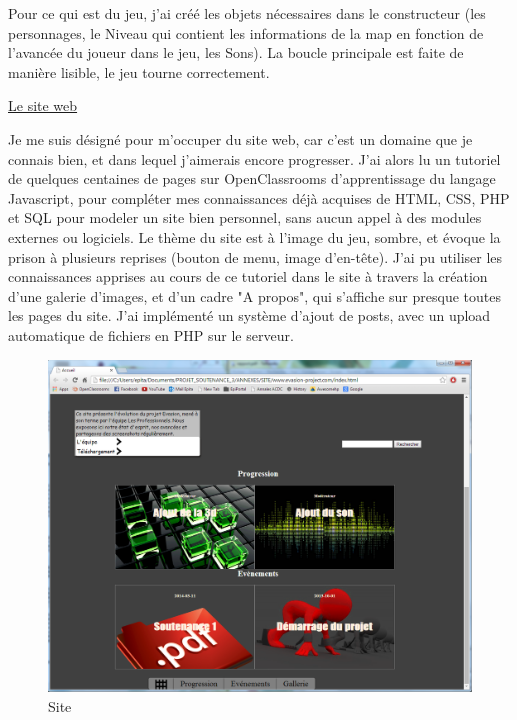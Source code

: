 \documentclass[12pt]{article}
\begin{document}
\par
Pour ce qui est du jeu, j'ai créé les objets nécessaires dans le constructeur (les personnages, le Niveau qui contient les informations de la map en fonction de l'avancée du joueur dans le jeu, les Sons). La boucle principale est faite de manière lisible, le jeu tourne correctement.

\underline{Le site web}
\par
Je me suis désigné pour m'occuper du site web, car c'est un domaine que je connais bien, et dans lequel j'aimerais encore progresser. J'ai alors lu un tutoriel de quelques centaines de pages sur OpenClassrooms d'apprentissage du langage Javascript, pour compléter mes connaissances déjà acquises de HTML, CSS, PHP et SQL pour modeler un site bien personnel, sans aucun appel à des modules externes ou logiciels. Le thème du site est à l'image du jeu, sombre, et évoque la prison à plusieurs reprises (bouton de menu, image d'en-tête). J'ai pu utiliser les connaissances apprises au cours de ce tutoriel dans le site à travers la création d'une galerie d'images, et d'un cadre "A propos", qui s'affiche sur presque toutes les pages du site. J'ai implémenté un système d'ajout de posts, avec un upload automatique de fichiers en PHP sur le serveur.
\newpage
\begin{figure}
\begin{center}
\includegraphics[scale=0.4]{Site.png} 
\caption{Site}
\end{center}
\end{figure}
\end{document}
